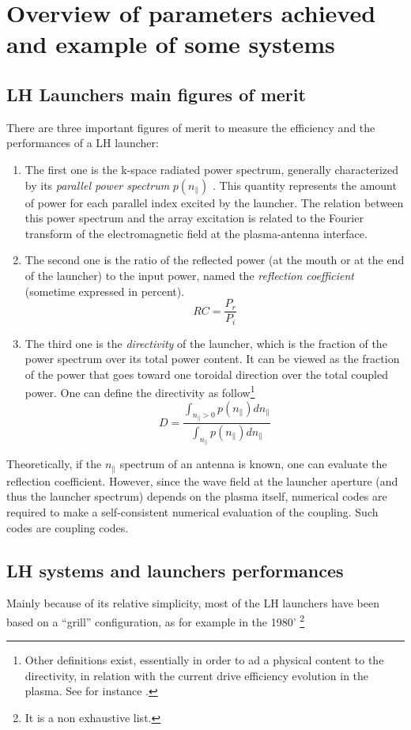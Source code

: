 \section{Overview of parameters achieved and example of some systems}
\subsection{LH Launchers main figures of merit}

There are three important figures of merit to measure the efficiency and the performances of a LH launcher: 
\begin{enumerate}
	\item The first one is the k-space radiated power spectrum, generally characterized by its \emph{parallel power spectrum} $p(n_{\parallel})$ . This quantity represents the amount of power for each parallel index excited by the launcher. The relation between this power spectrum and the array excitation is related to the Fourier transform of the electromagnetic field at the plasma-antenna interface. 

	\item  The second one is the ratio of the reflected power (at the mouth or at the end of the launcher) to the input power, named the \emph{reflection coefficient} (sometime expressed in percent). 
$$RC = \frac{P_r}{P_i}$$
	\item The third one is the \emph{directivity} of the launcher, which is the fraction of the power spectrum over its total power content. It can be viewed as the fraction of the power that goes toward one toroidal direction over the total coupled power. One can define the directivity as follow\footnote{Other definitions exist, essentially in order to ad a physical content to the directivity, in relation with the current drive efficiency evolution in the plasma. See for instance \parencite{Litaudon1990a}.}
$$
D
= 
\frac{
	\int_{n_{\parallel} >0} p(n_{\parallel}) dn_{\parallel} 
	}{
	\int_{n_{\parallel}} p(n_{\parallel}) dn_{\parallel} } 
$$
\end{enumerate}

Theoretically, if the $n_{\parallel}$ spectrum of an antenna is known, one can evaluate the reflection coefficient. However, since the wave field at the launcher aperture (and thus the launcher spectrum) depends on the plasma itself, numerical codes are required to make a self-consistent numerical evaluation of the coupling. Such codes are coupling codes.

\subsection{LH systems and launchers performances}
Mainly because of its relative simplicity, most of the LH launchers have been based on a “grill” configuration, as for example in the 1980' \parencite{Porkolab1984a, Gormezano1986a, Stevens1988}\footnote{It is a non exhaustive list.}

